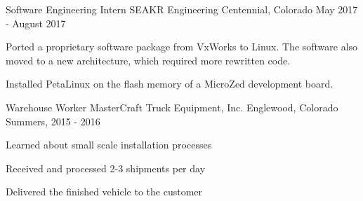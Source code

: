 \begin{cventries}
  \cventry
    {Software Engineering Intern}
    {SEAKR Engineering}
    {Centennial, Colorado}
    {May 2017 - August 2017}
    {
      \begin{cvitems}
         \item Ported a proprietary software package from VxWorks to Linux. The software also moved
               to a new architecture, which required more rewritten code.
         \item Installed PetaLinux on the flash memory of a MicroZed development board.
      \end{cvitems}
    }
  \cventry
    {Warehouse Worker}
    {MasterCraft Truck Equipment, Inc.}
    {Englewood, Colorado}
    {Summers, 2015 - 2016}
    {
      \begin{cvitems}
         \item Learned about small scale installation processes
         \item Received and processed 2-3 shipments per day
         \item Delivered the finished vehicle to the customer
      \end{cvitems}
    }
\end{cventries}
